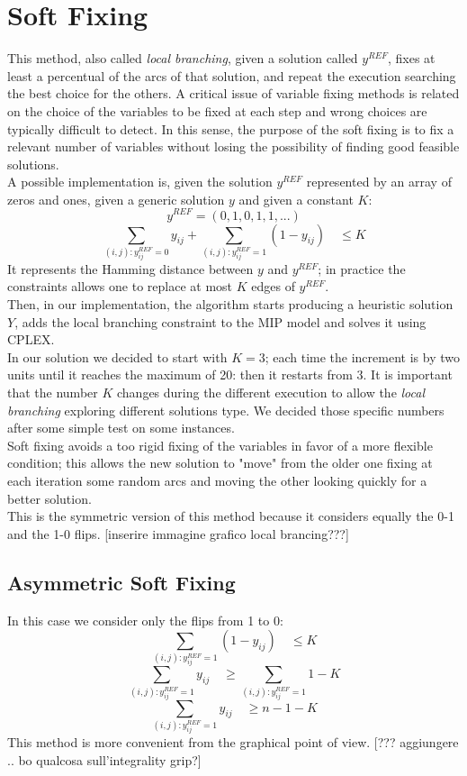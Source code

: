 \section{Soft Fixing}
This method, also called \textit{local branching}, given a solution called $y^{REF}$, fixes at least a percentual of the arcs of that solution, and repeat the execution searching the best choice for the others. A critical issue of variable fixing methods is related on the choice of the variables to be fixed at each step and wrong choices are typically difficult to detect. In this sense, the purpose of the soft fixing is to fix a relevant number of variables without losing the possibility of finding good feasible solutions.\\
A possible implementation is, given the solution $y^{REF}$ represented by an array of zeros and ones, given a generic solution $y$ and given a constant $K$:
\[
	y^{REF} = (0,1,0,1,1,...)
\]
\[
	\sum_{(i,j):y^{REF}_{ij}=0} y_{ij} + \sum_{(i,j):y^{REF}_{ij}=1} (1-y_{ij}) \quad \leq K
\]
It represents the Hamming distance between $y$ and $y^{REF}$; in practice the constraints allows one to replace at most $K$ edges of $y^{REF}$. \\
Then, in our implementation, the algorithm starts producing a heuristic solution $Y$, adds the local branching constraint to the MIP model and solves it using \textsc{CPLEX}.\\
In our solution we decided to start with $K=3$; each time the increment is by two units until it reaches the maximum of 20: then it restarts from 3. It is important that the number $K$ changes during the different execution to allow the \textit{local branching} exploring different solutions type. We decided those specific numbers after some simple test on some instances.\\
Soft fixing avoids a too rigid fixing of the variables in favor of a more flexible condition; this allows the new solution to "move" from the older one fixing at each iteration some random arcs and moving the other looking quickly for a better solution.\\
This is the symmetric version of this method because it considers equally the 0-1 and the 1-0 flips. 
[inserire immagine grafico local brancing???]
\subsection{Asymmetric Soft Fixing}
In this case we consider only the flips from 1 to 0:
\[
	\sum_{(i,j):y^{REF}_{ij}=1} (1-y_{ij}) \quad \leq K
\]
\[
	\sum_{(i,j):y^{REF}_{ij}=1} y_{ij} \quad \geq \sum_{(i,j):y^{REF}_{ij}=1} 1 - K
\]
\[
	\sum_{(i,j):y^{REF}_{ij}=1} y_{ij} \quad \geq n - 1 - K
\]
This method is more convenient from the graphical point of view. 
[??? aggiungere .. bo qualcosa sull'integrality grip?]
